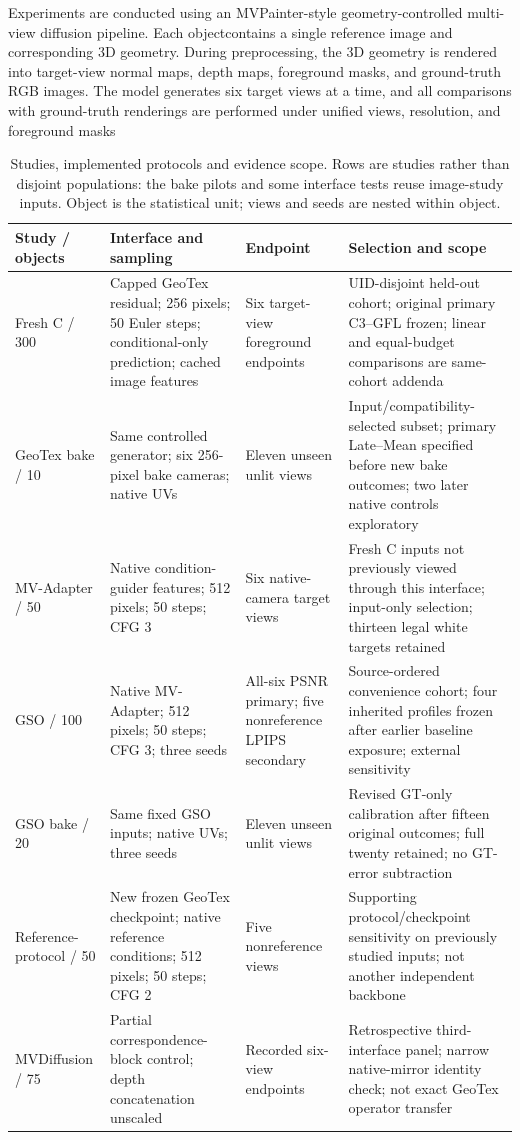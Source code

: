 \documentclass[times,twocolumn,final]{elsarticle}
\providecommand{\DIFdel}[1]{{\protect\color{red} \scriptsize #1}} %
\providecommand{\DIFaddbegin}{} %
\providecommand{\DIFdelbegin}{} %
\providecommand{\DIFdelend}{} %
\begin{document}
\DIFdelbegin \DIFdel{Experiments are conducted using an MVPainter-style geometry-controlled multi-view diffusion pipeline. Each objectcontains a single reference image and corresponding 3D geometry. During preprocessing, the 3D geometry is rendered into target-view normal maps, depth maps, foreground masks, and ground-truth RGB images. The model generates six target views at a time, and all comparisons with ground-truth renderings are performed under unified views, resolution, and foreground masks}\DIFdelend \DIFaddbegin \begin{table}[t]
\centering\scriptsize\setlength{\tabcolsep}{3pt}
\caption{Studies, implemented protocols and evidence scope. Rows are studies rather than disjoint populations: the bake pilots and some interface tests reuse image-study inputs. Object is the statistical unit; views and seeds are nested within object.}
\label{tab:study-design}
\begin{tabular}{p{}p{}p{}p{}}
\toprule Study / objects & Interface and sampling & Endpoint & Selection and scope \\
\midrule
Fresh C / 300 & Capped GeoTex residual; 256 pixels; 50 Euler steps; conditional-only prediction; cached image features & Six target-view foreground endpoints & UID-disjoint held-out cohort; original primary C3--GFL frozen; linear and equal-budget comparisons are same-cohort addenda \\
GeoTex bake / 10 & Same controlled generator; six 256-pixel bake cameras; native UVs & Eleven unseen unlit views & Input/compatibility-selected subset; primary Late--Mean specified before new bake outcomes; two later native controls exploratory \\
MV-Adapter / 50 & Native condition-guider features; 512 pixels; 50 steps; CFG 3 & Six native-camera target views & Fresh C inputs not previously viewed through this interface; input-only selection; thirteen legal white targets retained \\
GSO / 100 & Native MV-Adapter; 512 pixels; 50 steps; CFG 3; three seeds & All-six PSNR primary; five nonreference LPIPS secondary & Source-ordered convenience cohort; four inherited profiles frozen after earlier baseline exposure; external sensitivity \\
GSO bake / 20 & Same fixed GSO inputs; native UVs; three seeds & Eleven unseen unlit views & Revised GT-only calibration after fifteen original outcomes; full twenty retained; no GT-error subtraction \\
Reference-protocol / 50 & New frozen GeoTex checkpoint; native reference conditions; 512 pixels; 50 steps; CFG 2 & Five nonreference views & Supporting protocol/checkpoint sensitivity on previously studied inputs; not another independent backbone \\
MVDiffusion / 75 & Partial correspondence-block control; depth concatenation unscaled & Recorded six-view endpoints & Retrospective third-interface panel; narrow native-mirror identity check; not exact GeoTex operator transfer \\
\bottomrule
\end{tabular}
\end{table}
\end{document}
